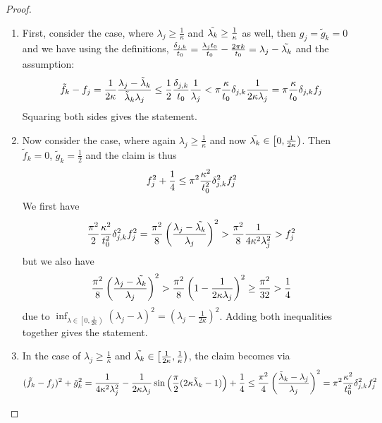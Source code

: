 \begin{proof}
    \begin{enumerate}[label=\Roman*.]
        \item First, consider the case, where \(\lambda_j \geq \frac{1}{\kappa}\) and \(\tilde{\lambda_k} \geq \frac{1}{\kappa}\) as well, then \(g_j = \tilde{g}_k = 0\) and we have using the definitions, \(\frac{\delta_{j, k}}{t_0} = \frac{\lambda_j t_0}{t_0} - \frac{2 \pi k}{t_0} = \lambda_j - \tilde{\lambda_k}\) and the assumption:
        \begin{align}
            \tilde{f}_k-f_j = \frac{1}{2\kappa}\frac{\lambda_j - \tilde{\lambda}_k}{\tilde{\lambda}_k\lambda_j} \leq \frac{1}{2}\frac{\delta_{j, k}}{t_0}\frac{1}{\lambda_j} < \pi \frac{\kappa}{t_0}\delta_{j, k}\frac{1}{2\kappa\lambda_j} = \pi \frac{\kappa}{t_0}\delta_{j, k} f_j
        \end{align}
        Squaring both sides gives the statement.
        \item Now consider the case, where again \(\lambda_j \geq \frac{1}{\kappa}\) and now \(\tilde{\lambda_k} \in \left[0, \frac{1}{2\kappa}\right)\). Then \(\tilde{f}_k = 0\), \(\tilde{g}_k = \frac{1}{2}\) and the claim is thus
        \begin{align}
            f_j^2+\frac{1}{4} \leq \pi^2\frac{\kappa^2}{t_0^2}\delta_{j, k}^2f_j^2
        \end{align}
        We first have
        \begin{align}
            \frac{\pi^2}{2}\frac{\kappa^2}{t_0^2}\delta_{j, k}^2f_j^2 = \frac{\pi^2}{8}\left(\frac{\lambda_j-\tilde{\lambda_k}}{\lambda_j}\right)^2 > \frac{\pi^2}{8}\frac{1}{4\kappa^2\lambda_j^2} > f_j^2
        \end{align}
        but we also have
        \begin{align}
            \frac{\pi^2}{8}\left(\frac{\lambda_j-\tilde{\lambda_k}}{\lambda_j}\right)^2 > \frac{\pi^2}{8}\left(1-\frac{1}{2\kappa\lambda_j}\right)^2 \geq \frac{\pi^2}{32} > \frac{1}{4}
        \end{align}
        due to \(\inf_{\lambda \in \left[0, \frac{1}{2\kappa}\right)} (\lambda_j-\lambda)^2 = \left(\lambda_j - \frac{1}{2\kappa}\right)^2\). Adding both inequalities together gives the statement.
        \item In the case of \(\lambda_j \geq \frac{1}{\kappa}\) and \(\tilde{\lambda_k} \in \left[\frac{1}{2\kappa}, \frac{1}{\kappa}\right)\), the claim becomes via 
        \begin{align}
            (\tilde{f}_k-f_j)^2+\tilde{g}_k^2 = \frac{1}{4\kappa^2\lambda_j^2}-\frac{1}{2\kappa\lambda_j}\sin\left(\frac{\pi}{2}(2\kappa\tilde{\lambda}_k-1)\right)+\frac{1}{4} \leq \frac{\pi^2}{4}\left(\frac{\tilde{\lambda}_k-\lambda_j}{\lambda_j}\right)^2 = \pi^2\frac{\kappa^2}{t_0^2}\djk^2f_j^2

\end{align}
\end{enumerate}
\end{proof}

